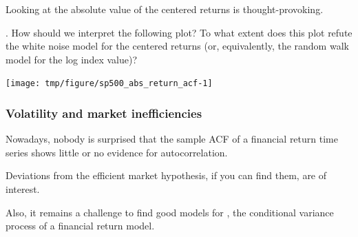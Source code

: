 \begin{frame}[fragile]

\vspace{-2mm}

\bi

\item Looking at the absolute value of the centered returns is thought-provoking.

\ei


\myquestion. How should we interpret the following plot? To what extent does this plot refute the white noise model for the centered returns (or, equivalently, the random walk model for the log index value)?


\begin{knitrout}\small
{}\color{fgcolor}\begin{kframe}
\begin{alltt}
\hlstd{(}\hlopt{-}\hlstd{=}\hlstd{)}
\end{alltt}
\end{kframe}
\end{knitrout}

\vspace{-1mm}

\begin{knitrout}\small
{}\color{fgcolor}

{\centering \texttt{[image: tmp/figure/sp500\_abs\_return\_acf-1]} 

}


\end{knitrout}


\end{frame}

\begin{frame}[fragile]

\frametitle{Volatility and market inefficiencies}

\bi

\item Nowadays, nobody is surprised that the sample ACF of a financial return time series shows little or no evidence for autocorrelation.

\item Deviations from the efficient market hypothesis, if you can find them, are of interest.

\item Also, it remains a challenge to find good models for , the conditional variance process of a financial return model.

\ei

\end{frame}


